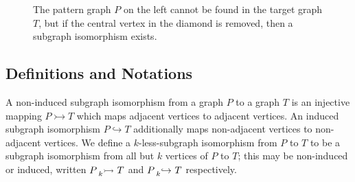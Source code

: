 \documentclass[letterpaper]{article}
\theoremstyle{definition}
\newcommand{\lessnonind}[1]{\prescript{}{#1}{\rightarrowtail}\ }
\newcommand{\lessind}[1]{\prescript{}{#1}{\hookrightarrow}\ }
\begin{document}
\begin{figure}
    \caption{The pattern graph $P$ on the left cannot be found in the target graph $T$, but if
    the central vertex in the diamond is removed, then a subgraph isomorphism exists.}
    \label{fig:subgraphexample}
\end{figure}
\subsection{Definitions and Notations}

A non-induced subgraph isomorphism from a graph $P$ to a graph $T$ is an injective mapping $P
\rightarrowtail T $ which maps adjacent vertices to adjacent vertices. An induced subgraph
isomorphism $P \hookrightarrow T$ additionally maps non-adjacent vertices to non-adjacent vertices.
We define a $k$-less-subgraph isomorphism from $P$ to $T$ to be a subgraph isomorphism from all but
$k$ vertices of $P$ to $T$; this may be non-induced or induced, written $P \lessnonind{k} T$ and $P
\lessind{k} T$ respectively.
\end{document}

